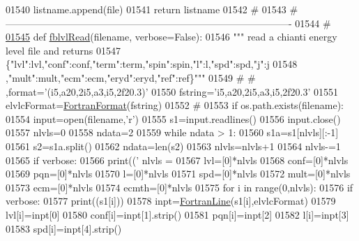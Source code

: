 \begin{DoxyCode}
{{{{{{{{{{{{{{01540                     listname.append(file)
01541     \textcolor{keywordflow}{return} listname
01542     \textcolor{comment}{#}
01543     \textcolor{comment}{# ----------------------------------------------------------------------------------------}
01544     \textcolor{comment}{#}
\hypertarget{__chianti__tools_8py_source_l01545}{}\hyperlink{namespacepyneb_1_1utils_1_1__chianti__tools_a63235035cef376c49a1f4e81933452a6}{01545} \textcolor{keyword}{def }\hyperlink{namespacepyneb_1_1utils_1_1__chianti__tools_a63235035cef376c49a1f4e81933452a6}{fblvlRead}(filename, verbose=False):
01546     \textcolor{stringliteral}{""" read a chianti energy level file and returns}
01547 \textcolor{stringliteral}{    \{"lvl":lvl,"conf":conf,"term":term,"spin":spin,"l":l,"spd":spd,"j":j}
01548 \textcolor{stringliteral}{    ,"mult":mult,"ecm":ecm,"eryd":eryd,"ref":ref\}"""}
01549 \textcolor{comment}{#        #  ,format='(i5,a20,2i5,a3,i5,2f20.3)'}
01550     fstring=\textcolor{stringliteral}{'i5,a20,2i5,a3,i5,2f20.3'}
01551     elvlcFormat=\hyperlink{classpyneb_1_1utils_1_1_fortran_format_1_1_fortran_format}{FortranFormat}(fstring)
01552     \textcolor{comment}{#}
01553     \textcolor{keywordflow}{if} os.path.exists(filename):
01554         input=open(filename,\textcolor{stringliteral}{'}\textcolor{stringliteral}{r')}
01555 \textcolor{stringliteral}{        s1=input.readlines()}
01556 \textcolor{stringliteral}{        input.close()}
01557 \textcolor{stringliteral}{        nlvls=0}
01558 \textcolor{stringliteral}{        ndata=2}
01559 \textcolor{stringliteral}{        }\textcolor{keywordflow}{while} ndata > 1:
01560             s1a=s1[nlvls][:-1]
01561             s2=s1a.split()
01562             ndata=len(s2)
01563             nlvls=nlvls+1
01564         nlvls-=1
01565         \textcolor{keywordflow}{if} verbose:
01566             print((\textcolor{stringliteral}{' nlvls = %
01567         lvl=[0]*nlvls
01568         conf=[0]*nlvls
01569         pqn=[0]*nlvls
01570         l=[0]*nlvls
01571         spd=[0]*nlvls
01572         mult=[0]*nlvls
01573         ecm=[0]*nlvls
01574         ecmth=[0]*nlvls
01575         \textcolor{keywordflow}{for} i \textcolor{keywordflow}{in} range(0,nlvls):
01576             \textcolor{keywordflow}{if} verbose:
01577                 print((s1[i]))
01578             inpt=\hyperlink{classpyneb_1_1utils_1_1_fortran_format_1_1_fortran_line}{FortranLine}(s1[i],elvlcFormat)
01579             lvl[i]=inpt[0]
01580             conf[i]=inpt[1].strip()
01581             pqn[i]=inpt[2]
01582             l[i]=inpt[3]
01583             spd[i]=inpt[4].strip()
}}}}}}}}}}}}}}}
\end{DoxyCode}
